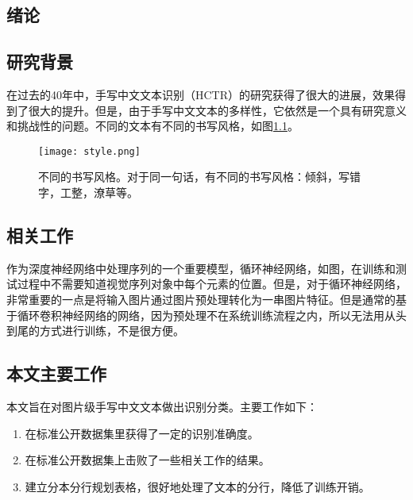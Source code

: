 \documentclass[winfonts, thesis]{njuthesis}
\begin{document}
\mainmatter
\begin{spacing}{1.625}
\chapter{绪论}\label{chapter_introduction}
\section{研究背景}
在过去的40年中，手写中文文本识别（HCTR）的研究获得了很大的进展，效果得到了很大的提升\cite{fujisawa2008forty}。但是，由于手写中文文本的多样性，它依然是一个具有研究意义和挑战性的问题\cite{xu2012touching}。不同的文本有不同的书写风格，如图\ref{fig:style}。 

\begin{figure}[htbp]
   \centering
   \texttt{[image: style.png]} %
   \caption{不同的书写风格。对于同一句话，有不同的书写风格：倾斜，写错字，工整，潦草等。}
   \label{fig:style}
\end{figure}

\section{相关工作}

作为深度神经网络中处理序列的一个重要模型，循环神经网络，如图，在训练和测试过程中不需要知道视觉序列对象中每个元素的位置。但是，对于循环神经网络，非常重要的一点是将输入图片通过图片预处理转化为一串图片特征\cite{graves2009novel,su2014accurate}。但是通常的基于循环卷积神经网络的网络，因为预处理不在系统训练流程之内，所以无法用从头到尾的方式进行训练，不是很方便。


\section{本文主要工作}
本文旨在对图片级手写中文文本做出识别分类。主要工作如下：
\begin{enumerate}
\item 在标准公开数据集里获得了一定的识别准确度。

\item 在标准公开数据集上击败了一些相关工作的结果。

\item 建立分本分行规划表格，很好地处理了文本的分行，降低了训练开销。


\end{enumerate}
\end{spacing}
\end{document}
